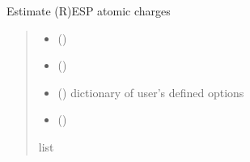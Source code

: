 \documentclass[letterpaper,10pt,english]{sphinxmanual}
\begin{document}
\begin{fulllineitems}
\label{\detokenize{fcdft.solvent:fcdft.solvent.esp.esp_atomic_charges}}
\pysigstartsignatures
\pysiglinewithargsret
{}
{\sphinxparamcomma {}\sphinxparamcomma {}\sphinxparamcomma {}\sphinxparamcomma {}}
{}
\pysigstopsignatures
\sphinxAtStartPar
Estimate (R)ESP atomic charges
\begin{quote}\begin{description}
\begin{itemize}
\item {} 
\sphinxAtStartPar
{} (\sphinxstyleliteralemphasis{\sphinxupquote{(}}\sphinxstyleliteralemphasis{\sphinxupquote{)}})

\item {} 
\sphinxAtStartPar
{} ()

\item {} 
\sphinxAtStartPar
{} (\sphinxstyleliteralemphasis{\sphinxupquote{, }}) \textendash{} dictionary of user’s defined options

\item {} 
\sphinxAtStartPar
{} (\sphinxstyleliteralemphasis{\sphinxupquote{, }})

\end{itemize}

\sphinxAtStartPar
{}

\sphinxAtStartPar
list

\end{description}\end{quote}

\end{fulllineitems}
\end{document}
